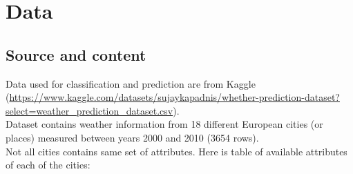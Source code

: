 \documentclass[a4paper]{article}
\begin{document}
	\newpage

	\section{Data}
	
	\subsection{Source and content}
	Data used for classification and prediction are from Kaggle (\url{https://www.kaggle.com/datasets/sujaykapadnis/whether-prediction-dataset?select=weather_prediction_dataset.csv}).
	\\
	
	Dataset contains weather information from 18 different European cities (or places) measured between years 2000 and 2010 (3654 rows).
	\\
	
	Not all cities contains same set of attributes. Here is table of available attributes of each of the cities:
	
\end{document}
